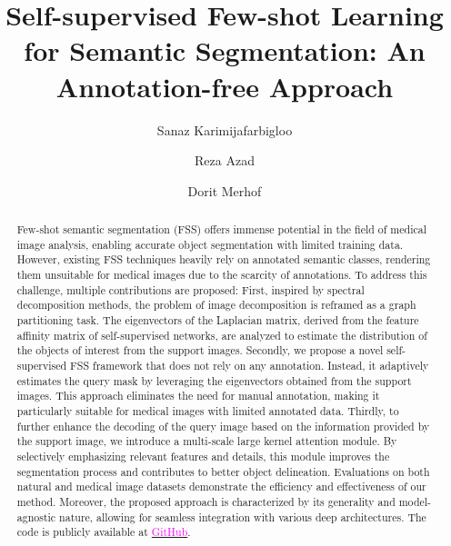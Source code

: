 \documentclass[runningheads]{llncs}
\begin{document}
\title{Self-supervised Few-shot Learning for Semantic Segmentation: An Annotation-free Approach}


\author{Sanaz Karimijafarbigloo \and
Reza Azad \and
Dorit Merhof}



\maketitle              

\begin{abstract}
Few-shot semantic segmentation (FSS) offers immense potential in the field of medical image analysis, enabling accurate object segmentation with limited training data. However, existing FSS techniques heavily rely on annotated semantic classes, rendering them unsuitable for medical images due to the scarcity of annotations. To address this challenge, multiple contributions are proposed: First, inspired by spectral decomposition methods, the problem of image decomposition is reframed as a graph partitioning task. The eigenvectors of the Laplacian matrix, derived from the feature affinity matrix of self-supervised networks, are analyzed to estimate the distribution of the objects of interest from the support images. 
Secondly, we propose a novel self-supervised FSS framework that does not rely on any annotation. Instead, it adaptively estimates the query mask by leveraging the eigenvectors obtained from the support images. This approach eliminates the need for manual annotation, making it particularly suitable for medical images with limited annotated data. Thirdly, to further enhance the decoding of the query image based on the information provided by the support image, we introduce a multi-scale large kernel attention module. By selectively emphasizing relevant features and details, this module improves the segmentation process and contributes to better object delineation.
Evaluations on both natural and medical image datasets demonstrate the efficiency and effectiveness of our method. Moreover, the proposed approach is characterized by its generality and model-agnostic nature, allowing for seamless integration with various deep architectures. The code is publicly available at \href{https://github.com/mindflow-institue/annotation_free_fewshot}{\textcolor{magenta}{GitHub}}.

\end{abstract}
\end{document}
